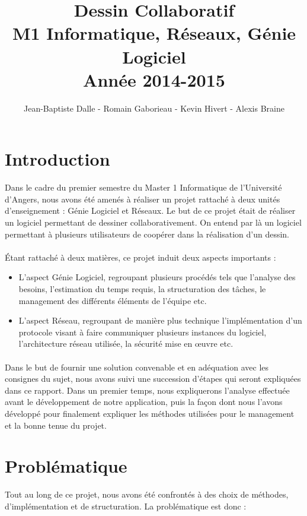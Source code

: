 \documentclass[a4paper,11pt]{article}
\title{Dessin Collaboratif\\ M1 Informatique, Réseaux, Génie Logiciel\\
Année 2014-2015}
\author{Jean-Baptiste Dalle - Romain Gaborieau - Kevin Hivert - Alexis Braine}
\date{}
\begin{document}
\maketitle
\pagebreak
\tableofcontents

\pagebreak
\section{Introduction}
Dans le cadre du premier semestre du Master 1 Informatique de l'Université d'Angers, nous avons été amenés à réaliser un projet rattaché à deux unités d'enseignement : Génie Logiciel et Réseaux. Le but de ce projet était de réaliser un logiciel permettant de dessiner collaborativement. On entend par là un logiciel permettant à plusieurs utilisateurs de coopérer dans la réalisation d'un dessin.

\paragraph{} Étant rattaché à deux matières, ce projet induit deux aspects importants :

\begin{itemize}
	\item L'aspect Génie Logiciel, regroupant plusieurs procédés tels que l'analyse des besoins, l'estimation du temps requis, la structuration des tâches, le management des différents éléments de l'équipe etc.
	\item L'aspect Réseau, regroupant de manière plus technique l'implémentation d'un protocole visant à faire communiquer plusieurs instances du logiciel, l'architecture réseau utilisée, la sécurité mise en œuvre etc.
\end{itemize}

\paragraph{} Dans le but de fournir une solution convenable et en adéquation avec les consignes du sujet, nous avons suivi une succession d'étapes qui seront expliquées dans ce rapport. Dans un premier temps, nous expliquerons l'analyse effectuée avant le développement de notre application, puis la façon dont nous l'avons développé pour finalement expliquer les méthodes utilisées pour le management et la bonne tenue du projet.


\section{Problématique}
Tout au long de ce projet, nous avons été confrontés à des choix de méthodes, d'implémentation et de structuration. La problématique est donc :
\end{document}
